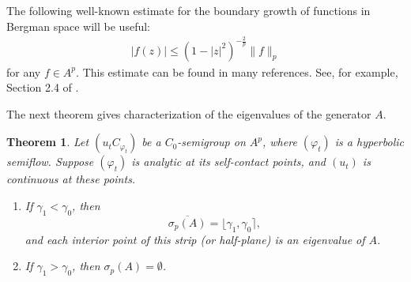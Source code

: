 \documentclass{amsart}
\theoremstyle{proclaim}
\newtheorem{theorem}{Theorem}[section]
\theoremstyle{fancyproclaim}
\theoremstyle{definition}
\theoremstyle{fancystatement}
\numberwithin{equation}{section}
\begin{document}
The following well-known estimate for the boundary growth of functions in Bergman space will be useful:
\begin{align}\label{bergman}
|f(z)|\leq(1 - |z|^2)^{-\frac{2}{p}} \|f\|_p
\end{align}
for any $f\in A^p$. This estimate can be found in many references. See, for example, Section 2.4 of \cite{bergman}.



The next theorem gives characterization of the eigenvalues of the generator $A$.

\begin{theorem}\label{eigenvalue}
Let $(u_tC_{\varphi_t})$ be a $C_0$-semigroup on $A^p$, where $(\varphi_t)$ is a hyperbolic semiflow. Suppose $(\varphi_t)$ is analytic at its self-contact points, and $(u_t)$ is continuous at these points.
\begin{enumerate}
\item If $\gamma_1<\gamma_0$, then 
$$\overline{\sigma_p(A)}=\lfloor\gamma_1,\gamma_0\rceil,$$
and each interior point of this strip  (or half-plane) is an eigenvalue of $A$.

\item  If $\gamma_1>\gamma_0$, then $\sigma_p(A)=\emptyset$.
\end{enumerate}
\end{theorem}
\end{document}
